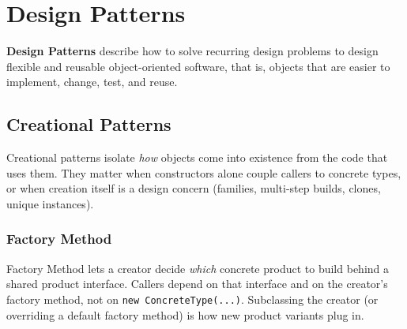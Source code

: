 \chapter{Design Patterns}
\label{chap:designpatterns}
\textbf{Design Patterns} describe how to solve recurring design problems 
to design flexible and reusable object-oriented software, that is, 
objects that are easier to implement, change, test, and reuse.

\newpage
\section{Creational Patterns}
\label{sec:creational}

Creational patterns isolate \emph{how} objects come into existence from the code that uses them.
They matter when constructors alone couple callers to concrete types, or when creation itself is a design concern (families, multi-step builds, clones, unique instances).

\subsection{Factory Method}
Factory Method lets a creator decide \emph{which} concrete product to build behind a shared product interface.
Callers depend on that interface and on the creator's factory method, not on \texttt{new ConcreteType(...)}.
Subclassing the creator (or overriding a default factory method) is how new product variants plug in.

